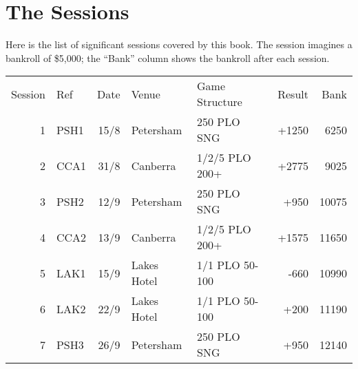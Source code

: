 \chapter{The Sessions}

Here is the list of significant sessions covered by this book. The
session imagines a bankroll of \$5,000; the ``Bank'' column shows
the bankroll after each session.

\begin{tabular}{rlrllrr}
 Session & Ref & Date & Venue & Game Structure & Result & Bank \\
  1  &   PSH1    & 15/8 & Petersham & 250 PLO SNG & +1250 & 6250 \\
  2  &   CCA1    & 31/8 & Canberra  & 1/2/5 PLO 200+ & +2775 & 9025 \\
  3  &   PSH2    & 12/9 & Petersham & 250 PLO SNG & +950 & 10075 \\
  4  &   CCA2    & 13/9 & Canberra  & 1/2/5 PLO 200+ & +1575 & 11650 \\
  5  &   LAK1    & 15/9 & Lakes Hotel & 1/1 PLO 50-100 & -660 & 10990 \\
  6  &   LAK2    & 22/9 & Lakes Hotel & 1/1 PLO 50-100 & +200 & 11190 \\
  7  &   PSH3    & 26/9 & Petersham & 250 PLO SNG & +950 & 12140 \\
\end{tabular}
